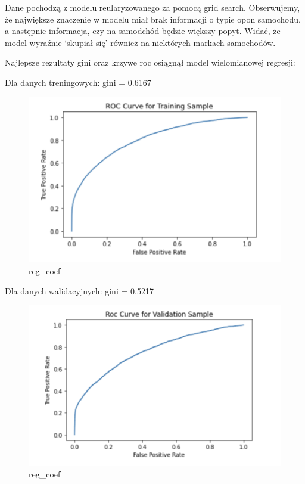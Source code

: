 \documentclass[11pt]{article}
\begin{document}
Dane pochodzą z modelu reularyzowanego za pomocą grid search.
Obserwujemy, że największe znaczenie w modelu miał brak informacji o
typie opon samochodu, a następnie informacja, czy na samodchód będzie
większy popyt. Widać, że model wyraźnie `skupiał się' również na
niektórych markach samochodów.

Najlepsze rezultaty gini oraz krzywe roc osiągnął model wielomianowej
regresji:

Dla danych treningowych: gini = 0.6167

\begin{figure}
\centering
\includegraphics{plots/reg_roc_train.png}
\caption{reg\_coef}
\end{figure}

Dla danych walidacyjnych: gini = 0.5217

\begin{figure}
\centering
\includegraphics{plots/reg_roc_val.png}
\caption{reg\_coef}
\end{figure}
\end{document}
